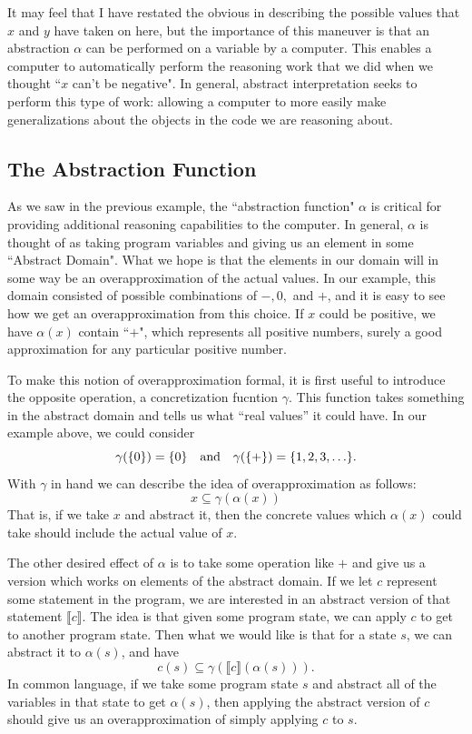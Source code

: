 It may feel that I have restated the obvious in describing the possible values that $x$ and $y$ have taken on here, but the importance of this maneuver is that an abstraction $\alpha$ can be performed on a variable by a computer.
This enables a computer to automatically perform the reasoning work that we did when we thought ``$x$ can't be negative".
In general, abstract interpretation seeks to perform this type of work: allowing a computer to more easily make generalizations about the objects in the code we are reasoning about.

\subsection{The Abstraction Function}

As we saw in the previous example, the ``abstraction function" $\alpha$ is critical for providing additional reasoning capabilities to the computer.
In general, $\alpha$ is thought of as taking program variables and giving us an element in some ``Abstract Domain".
What we hope is that the elements in our domain will in some way be an overapproximation of the actual values. 
In our example, this domain consisted of possible combinations of $-, 0,$ and $+$, and it is easy to see how we get an overapproximation from this choice.
If $x$ could be positive, we have $\alpha(x)$ contain ``$+$", which represents all positive numbers, surely a good approximation for any particular positive number.

To make this notion of overapproximation formal, it is first useful to introduce the opposite operation, a concretization fucntion $\gamma$. 
This function takes something in the abstract domain and tells us what ``real values'' it could have. 
In our example above, we could consider
\[
\gamma(\{0\}) = \{0\} \quad \text{and} \quad \gamma(\{+\}) = \{1, 2, 3, \ldots \}.
\]
With $\gamma$ in hand we can describe the idea of overapproximation as follows:
\[
x \subseteq \gamma(\alpha(x))
\]
That is, if we take $x$ and abstract it, then the concrete values which $\alpha(x)$ could take should include the actual value of $x$.

The other desired effect of $\alpha$ is to take some operation like $+$ and give us a version which works on elements of the abstract domain.
If we let $c$ represent some statement in the program, we are interested in an abstract version of that statement $\llbracket c \rrbracket$.
The idea is that given some program state, we can apply $c$ to get to another program state.
Then what we would like is that for a state $s$, we can abstract it to $\alpha(s)$, and have 
\[
c(s) \subseteq \gamma(\llbracket c \rrbracket(\alpha(s))).
\]
In common language, if we take some program state $s$ and abstract all of the variables in that state to get $\alpha(s)$, then applying the abstract version of $c$ should give us an overapproximation of simply applying $c$ to $s$.

